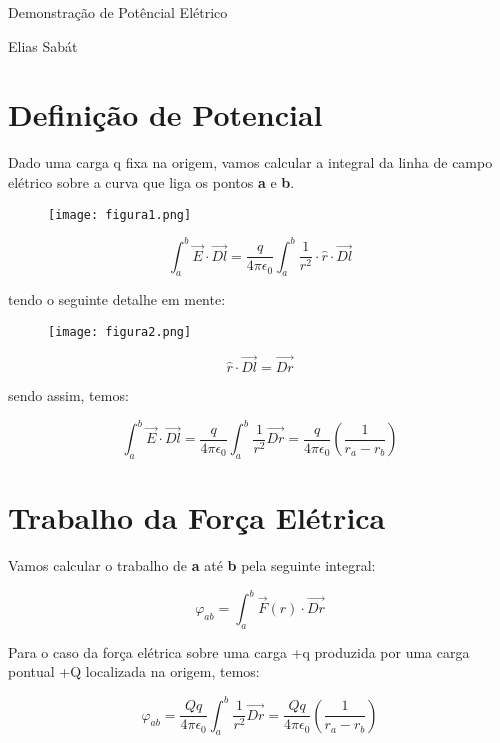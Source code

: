 \documentclass[a4paper, 12pt]{article}
\begin{document}
\begin{center}
	\huge{Demonstração de Potêncial Elétrico}
\end{center}
\begin{center}
	Elias Sabát
\end{center}
\section{Definição de Potencial}
	Dado uma carga q fixa na origem, vamos calcular a integral da linha de campo elétrico sobre a curva que liga os pontos \textbf{a} e \textbf{b}.

\begin{center}
	\begin{figure}[!htb]
		\texttt{[image: figura1.png]}
	\end{figure}
\end{center}

$$\int_{a}^{b}\vec{E} \cdot \vec{Dl}= \dfrac{q}{4\pi\epsilon_{0}}\int^{b}_{a}\dfrac{1}{r^2} \cdot \widehat{r} \cdot \vec{Dl} $$


tendo o seguinte detalhe em mente:
\begin{center}
	\begin{figure}[!htb]
		\texttt{[image: figura2.png]}
	\end{figure}
\end{center}
$$\widehat{r} \cdot \vec{Dl} = \vec{Dr}$$


sendo assim, temos: 

$$\int_{a}^{b}\vec{E} \cdot \vec{Dl} = \dfrac{q}{4\pi\epsilon_{0}}\int^{b}_{a}\dfrac{1}{r^2}\vec{Dr} = \dfrac{q}{4\pi\epsilon_{0}} \left(\dfrac{1}{r_{a} - r_{b}}\right)$$

\newpage

\section{Trabalho da Força Elétrica}

Vamos calcular o trabalho de \textbf{a} até \textbf{b} pela seguinte integral:

$$\varphi_{ab} = \int^b_{a} \vec{F}(r) \cdot \vec{Dr}$$

Para o caso da força elétrica sobre uma carga +q produzida
por uma carga pontual +Q localizada na origem, temos:

$$\varphi_{ab} = \dfrac{Qq}{4\pi\epsilon_{0}} \int^b_a\dfrac{1}{r^2}\vec{Dr} = \dfrac{Qq}{4\pi\epsilon_{0}} \left(\dfrac{1}{r_{a} - r_{b}}\right)$$
\end{document}
